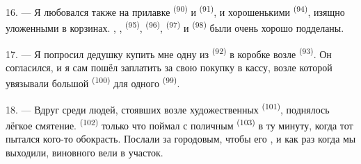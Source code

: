 16. --- Я любовался также на прилавке  \textsuperscript{(90)} и
 \textsuperscript{(91)}, и хорошенькими
 \textsuperscript{(94)}, изящно уложенными в
корзинах. , ,  \textsuperscript{(95)},
 \textsuperscript{(96)},  \textsuperscript{(97)} и
 \textsuperscript{(98)} были очень хорошо подделаны.

\VUsaut{4.4mm}
\VUsaut{2.8mm}

17. --- Я попросил дедушку купить мне одну из 
\textsuperscript{(92)} в коробке возле  \textsuperscript{(93)}. Он
согласился, и я сам пошёл заплатить за свою покупку в кассу, возле которой
увязывали большой  \textsuperscript{(100)} для одного
 \textsuperscript{(99)}.

18. --- Вдруг среди людей, стоявших возле художественных 
\textsuperscript{(101)}, поднялось лёгкое смятение.  \textsuperscript{(102)}
только что поймал с поличным  \textsuperscript{(103)} в
ту минуту, когда тот пытался кого-то обокрасть. Послали за городовым, чтобы
его , и как раз когда мы выходили, виновного вели в
участок.
\VUsaut{6.0mm}
\VUfilet{22mm}
